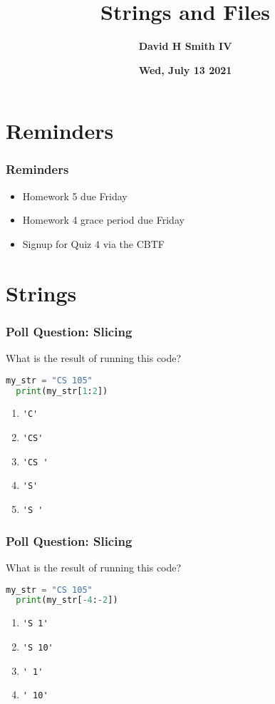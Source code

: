 \documentclass{beamer}
\title{\textbf{Strings and Files}}
\author{\textbf{David H Smith IV}}
\institute[\textbf{UIUC}]{\textbf{University of Illinois Urbana-Champaign}}
\date{\textbf{Wed, July 13 2021}}
\begin{document}
\frame{\titlepage}

\section{Reminders}

%
%
\begin{frame}
  \frametitle{Reminders}
  \begin{itemize}
    \item Homework 5 due Friday
    \item Homework 4 grace period due Friday
    \item Signup for Quiz 4 via the CBTF
  \end{itemize}
\end{frame}

\section{Strings}


%
%
\begin{frame}[fragile]
  \frametitle{Poll Question: Slicing}
  What is the result of running this code?
  \begin{lstlisting}[language=Python, autogobble]
  my_str = "CS 105"
  print(my_str[1:2])
  \end{lstlisting}
  \vfill
  \begin{enumerate}[A]
    \item \lstinline|'C'|
    \item \lstinline|'CS'|
    \item \lstinline|'CS '|
    \item \lstinline|'S'|
    \item \lstinline|'S '|
  \end{enumerate}
\end{frame}



%
%
\begin{frame}[fragile]
  \frametitle{Poll Question: Slicing}
  What is the result of running this code?
  \begin{lstlisting}[language=Python, autogobble]
  my_str = "CS 105"
  print(my_str[-4:-2])
  \end{lstlisting}
  \vfill
  \begin{enumerate}[A]
    \item \lstinline|'S 1'|
    \item \lstinline|'S 10'|
    \item \lstinline|' 1'|
    \item \lstinline|' 10'|
  \end{enumerate}
\end{frame}
\end{document}
